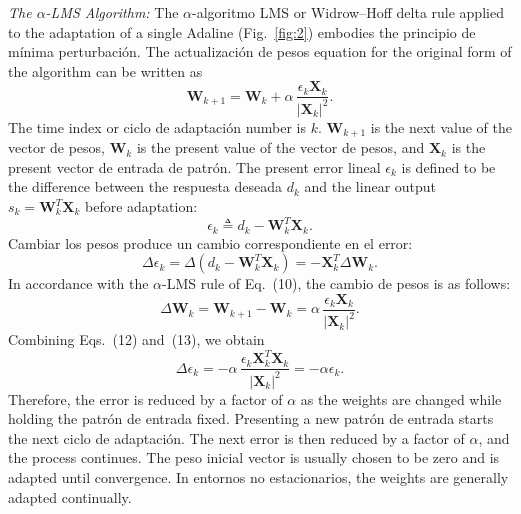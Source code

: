 \documentclass[10pt,twocolumn]{article}
\newcommand{\X}{\bm{X}}
\newcommand{\W}{\bm{W}}
\begin{document}
\textit{The $\alpha$-LMS Algorithm:} The $\alpha$-algoritmo LMS or Widrow--Hoff
delta rule applied to the adaptation of a single Adaline (Fig.~\ref{fig:2})
embodies the principio de mínima perturbación. The actualización de pesos equation for the
original form of the algorithm can be written as
\begin{equation}
\W_{k+1} = \W_k + \alpha\,\frac{\epsilon_k \X_k}{|\X_k|^2}. \tag{10}
\end{equation}
The time index or ciclo de adaptación number is $k$. $\W_{k+1}$ is the next value of
the vector de pesos, $\W_k$ is the present value of the vector de pesos, and $\X_k$
is the present vector de entrada de patrón. The present error lineal $\epsilon_k$ is
defined to be the difference between the respuesta deseada $d_k$ and the linear
output $s_k = \W_k^{T}\X_k$ before adaptation:
\begin{equation}
\epsilon_k \triangleq d_k - \W_k^{T}\X_k. \tag{11}
\end{equation}
Cambiar los pesos produce un cambio correspondiente en el error:
\begin{equation}
\Delta\epsilon_k = \Delta(d_k - \W_k^{T}\X_k) = -\X_k^{T}\Delta\W_k. \tag{12}
\end{equation}
In accordance with the $\alpha$-LMS rule of Eq.~(10), the cambio de pesos is as
follows:
\begin{equation}
\Delta\W_k = \W_{k+1}-\W_k = \alpha\,\frac{\epsilon_k \X_k}{|\X_k|^2}. \tag{13}
\end{equation}
Combining Eqs.~(12) and~(13), we obtain
\begin{equation}
\Delta\epsilon_k = -\alpha\,\frac{\epsilon_k \X_k^{T}\X_k}{|\X_k|^2} = -\alpha\epsilon_k. \tag{14}
\end{equation}
Therefore, the error is reduced by a factor of $\alpha$ as the weights are changed
while holding the patrón de entrada fixed. Presenting a new patrón de entrada starts the
next ciclo de adaptación. The next error is then reduced by a factor of $\alpha$, and
the process continues. The peso inicial vector is usually chosen to be zero and
is adapted until convergence. In entornos no estacionarios, the weights are
generally adapted continually.
\end{document}
